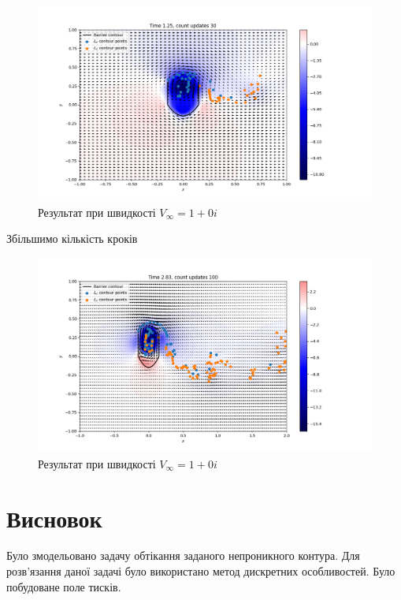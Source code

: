 \documentclass[a4paper,12pt]{article}
\begin{document}
	\begin{figure}[h]
		\begin{center}\includegraphics[scale=0.5]{U_form_30} \end{center}
		\caption{Результат при швидкості $V_{\infty} = 1 +0i$}
		\label{fig:result_one1}
	\end{figure}

	Збільшимо кількість кроків
	
	\begin{figure}[ht]
		\begin{center}\includegraphics[scale=0.5]{U_form_100} \end{center}
		\caption{Результат при швидкості $V_{\infty} = 1 +0i$}
		\label{fig:result_one2}
	\end{figure}
	\newpage
	\section{Висновок}
	Було змодельовано задачу обтікання заданого непроникного контура. Для розв'язання даної задачі було використано метод дискретних особливостей. Було побудоване поле тисків.
	
\end{document}
